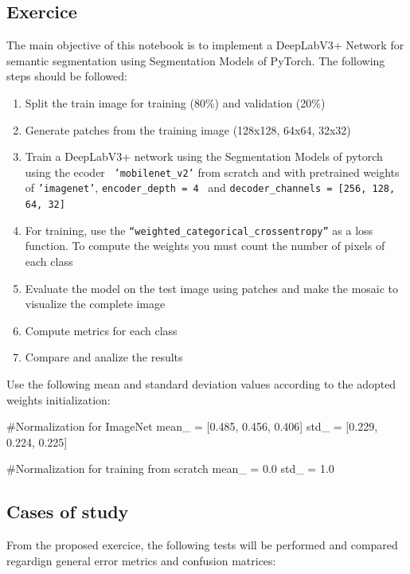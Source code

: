 \documentclass[10pt, a4paper]{article}
\begin{document}
\subsection{Exercice}


The main objective of this notebook is to implement a DeepLabV3+ Network for semantic segmentation using Segmentation Models of PyTorch. 
The following steps should be followed:

\begin{enumerate}
  \item Split the train image for training (80\%) and validation (20\%)
  \item Generate patches from the training image (128x128, 64x64, 32x32)
  \item Train a DeepLabV3+ network using the Segmentation Models of pytorch using the ecoder \ 
        {\tt 'mobilenet\_v2'} from scratch and with pretrained weights of {\tt 'imagenet'}, {\tt encoder\_depth = 4} \
        and {\tt decoder\_channels = [256, 128, 64, 32]}\label{item:step03}
  \item For training, use the {\tt “weighted\_categorical\_crossentropy”} as a loss function. To compute the weights you must count the number of pixels of each class
  \item Evaluate the model on the test image using patches and make the mosaic to visualize the complete image
  \item Compute metrics for each class
  \item Compare and analize the results
\end{enumerate}

Use the following mean and standard deviation values according to the adopted weights initialization:

\begin{python}
  #Normalization for ImageNet
  mean_ = [0.485, 0.456, 0.406]
  std_  = [0.229, 0.224, 0.225]

  #Normalization for training from scratch
  mean_ = 0.0
  std_  = 1.0
\end{python}

\subsection{Cases of study}

From the proposed exercice, the following tests will be performed and compared regardign general error metrics and confusion matrices:
\end{document}
